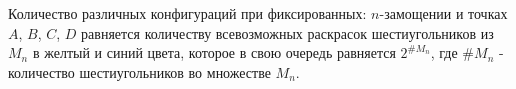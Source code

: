 \begin{note} \label{2.15}
Количество различных конфигураций при фиксированных: $n$-замощении и точках $A$, $B$, $C$, $D$ равняется количеству всевозможных раскрасок шестиугольников из $M_n$ в желтый и синий цвета, которое в свою очередь равняется $2^{\# M_n}$, где $\# M_n$ - количество шестиугольников во множестве $M_n$. 
\end{note}